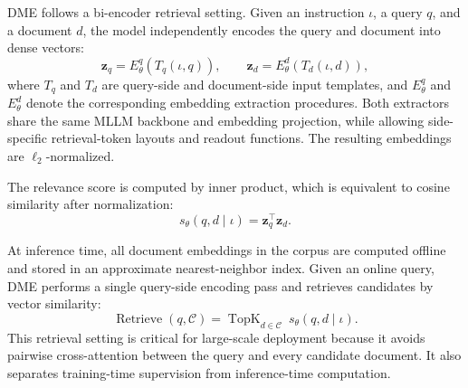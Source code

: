 DME follows a bi-encoder retrieval setting. Given an instruction $\iota$, a query $q$, and a document $d$, the model independently encodes the query and document into dense vectors:
\begin{equation}
    \mathbf{z}_q
    =
    E_{\theta}^{q}
    \left(
        T_q(\iota,q)
    \right),
    \qquad
    \mathbf{z}_d
    =
    E_{\theta}^{d}
    \left(
        T_d(\iota,d)
    \right),
\label{eq:bi-encoder-extraction}
\end{equation}
where $T_q$ and $T_d$ are query-side and document-side input templates, and $E_{\theta}^{q}$ and $E_{\theta}^{d}$ denote the corresponding embedding extraction procedures. Both extractors share the same MLLM backbone and embedding projection, while allowing side-specific retrieval-token layouts and readout functions. The resulting embeddings are $\ell_2$-normalized.

The relevance score is computed by inner product, which is equivalent to cosine similarity after normalization:
\begin{equation}
    s_\theta(q,d\mid\iota)
    =
    \mathbf{z}_q^\top \mathbf{z}_d.
\label{eq:retrieval-score}
\end{equation}

At inference time, all document embeddings in the corpus are computed offline and stored in an approximate nearest-neighbor index. Given an online query, DME performs a single query-side encoding pass and retrieves candidates by vector similarity:
\begin{equation}
    \operatorname{Retrieve}(q, \mathcal{C})
    =
    \operatorname{TopK}_{d \in \mathcal{C}}
    \ s_\theta(q, d \mid \iota).
\end{equation}
This retrieval setting is critical for large-scale deployment because it avoids pairwise cross-attention between the query and every candidate document. It also separates training-time supervision from inference-time computation.


